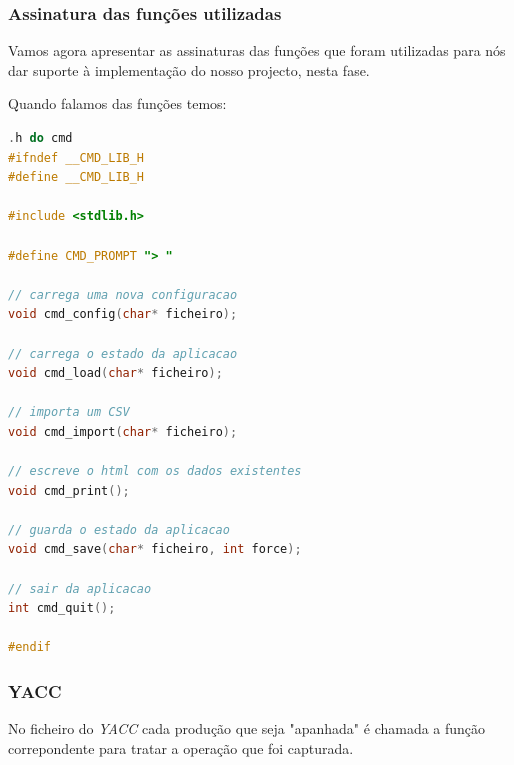 \documentclass[11pt, a4paper, oneside]{article}
\begin{document}
\subsubsection{Assinatura das funções utilizadas}
Vamos agora apresentar as assinaturas das funções que foram utilizadas para nós dar suporte à implementação do nosso projecto, nesta fase.

Quando falamos das funções temos: 
\begin{lstlisting}[language=C, caption={Construtores do ficheiro de consola.}]
.h do cmd
#ifndef __CMD_LIB_H
#define __CMD_LIB_H

#include <stdlib.h>

#define CMD_PROMPT "> "

// carrega uma nova configuracao
void cmd_config(char* ficheiro);

// carrega o estado da aplicacao
void cmd_load(char* ficheiro);

// importa um CSV
void cmd_import(char* ficheiro);

// escreve o html com os dados existentes
void cmd_print();

// guarda o estado da aplicacao
void cmd_save(char* ficheiro, int force);

// sair da aplicacao
int cmd_quit();

#endif
\end{lstlisting} 
\newpage

\subsubsection{YACC}

No ficheiro do \textit{YACC} cada produção que seja "apanhada" é chamada a função correpondente para tratar a operação que foi capturada.
\end{document}
